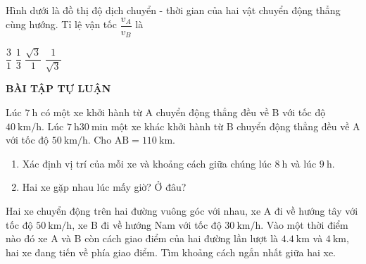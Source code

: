 \begin{ex}
	Hình dưới là đồ thị độ dịch chuyển - thời gian của hai vật chuyển động thẳng cùng hướng. Tỉ lệ vận tốc $\dfrac{v_A}{v_B}$ là
	\begin{center}
	\end{center}
	\choice
	{$\dfrac{3}{1}$}
	{$\dfrac{1}{3}$}
	{$\dfrac{\sqrt{3}}{1}$}
	{$\dfrac{1}{\sqrt{3}}$}
	\loigiai{}
\end{ex}
\textbf{BÀI TẬP TỰ LUẬN}
\begin{ex}
	Lúc $\SI{7}{\hour}$ có một xe khởi hành từ A chuyển động thẳng đều về B với tốc độ $\SI{40}{\kilo\meter/\hour}$. Lúc $\SI{7}{\hour}\SI{30}{\minute}$ một xe khác khởi hành từ B chuyển động thẳng đều về A  với tốc độ $\SI{50}{\kilo\meter/\hour}$. Cho $\mathrm{AB}=\SI{110}{\kilo\meter}$.
	\begin{enumerate}[label=\alph*)]
		\item Xác định vị trí của mỗi xe và khoảng cách giữa chúng lúc $\SI{8}{\hour}$ và lúc $\SI{9}{\hour}$.
		\item Hai xe gặp nhau lúc mấy giờ? Ở đâu?
	\end{enumerate}
\end{ex}
\begin{ex}
	Hai xe chuyển động trên hai đường vuông góc với nhau, xe A đi về hướng tây với tốc độ $\SI{50}{\kilo\meter/\hour}$, xe B đi về hướng Nam với tốc độ $\SI{30}{\kilo\meter/\hour}$. Vào một thời điểm nào đó xe A và B còn cách giao điểm của hai đường lần lượt là $\SI{4.4}{\kilo\meter}$ và $\SI{4}{\kilo\meter}$, hai xe đang tiến về phía giao điểm. Tìm khoảng cách ngắn nhất giữa hai xe.
\end{ex}